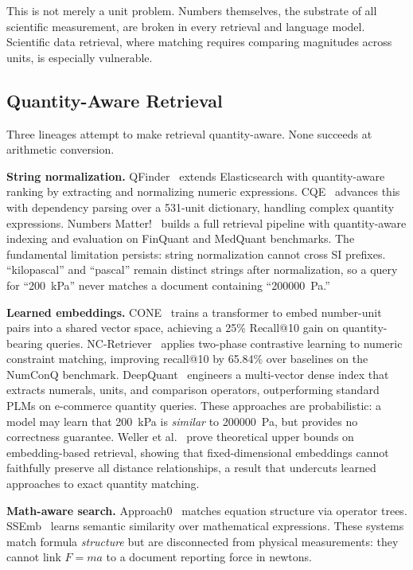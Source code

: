 This is not merely a unit problem. Numbers themselves, the substrate of all scientific measurement, are broken in every retrieval and language model. Scientific data retrieval, where matching requires comparing magnitudes across units, is especially vulnerable.

\subsection{Quantity-Aware Retrieval}

Three lineages attempt to make retrieval quantity-aware. None succeeds at arithmetic conversion.

\textbf{String normalization.} QFinder~\cite{qfinder2022} extends Elasticsearch with quantity-aware ranking by extracting and normalizing numeric expressions. CQE~\cite{cqe2023} advances this with dependency parsing over a 531-unit dictionary, handling complex quantity expressions. Numbers Matter!~\cite{numbersmatter2024} builds a full retrieval pipeline with quantity-aware indexing and evaluation on FinQuant and MedQuant benchmarks. The fundamental limitation persists: string normalization cannot cross SI prefixes. ``kilopascal'' and ``pascal'' remain distinct strings after normalization, so a query for ``200~kPa'' never matches a document containing ``200000~Pa.''

\textbf{Learned embeddings.} CONE~\cite{cone2026} trains a transformer to embed number-unit pairs into a shared vector space, achieving a 25\% Recall@10 gain on quantity-bearing queries. NC-Retriever~\cite{ncretriever2025} applies two-phase contrastive learning to numeric constraint matching, improving recall@10 by 65.84\% over baselines on the NumConQ benchmark. DeepQuant~\cite{deepquant2025} engineers a multi-vector dense index that extracts numerals, units, and comparison operators, outperforming standard PLMs on e-commerce quantity queries. These approaches are probabilistic: a model may learn that 200~kPa is \emph{similar} to 200000~Pa, but provides no correctness guarantee. Weller et al.~\cite{embedding_limits2025} prove theoretical upper bounds on embedding-based retrieval, showing that fixed-dimensional embeddings cannot faithfully preserve all distance relationships, a result that undercuts learned approaches to exact quantity matching.

\textbf{Math-aware search.} Approach0~\cite{approach0} matches equation structure via operator trees. SSEmb~\cite{ssemb2025} learns semantic similarity over mathematical expressions. These systems match formula \emph{structure} but are disconnected from physical measurements: they cannot link $F = ma$ to a document reporting force in newtons.

